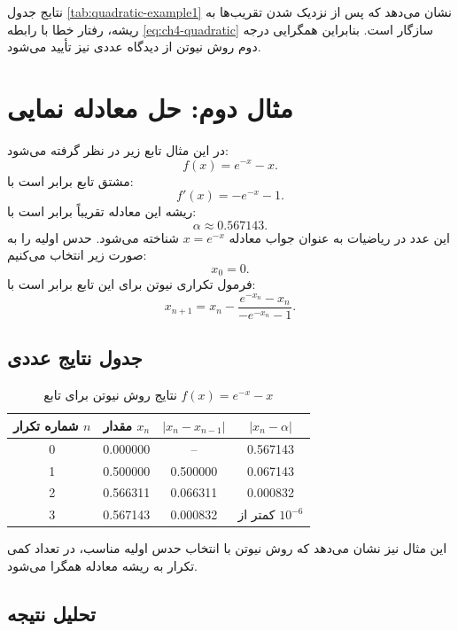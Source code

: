 نتایج جدول \ref{tab:quadratic-example1} نشان می‌دهد که پس از نزدیک شدن تقریب‌ها به ریشه، رفتار خطا با رابطه \eqref{eq:ch4-quadratic} سازگار است. بنابراین همگرایی درجه دوم روش نیوتن از دیدگاه عددی نیز تأیید می‌شود.

\section{مثال دوم: حل معادله نمایی}

در این مثال تابع زیر در نظر گرفته می‌شود:
\begin{equation}
f(x)=e^{-x}-x.
\label{eq:ch4-ex2-func}
\end{equation}
مشتق تابع برابر است با:
\begin{equation}
f'(x)=-e^{-x}-1.
\label{eq:ch4-ex2-deriv}
\end{equation}
ریشه این معادله تقریباً برابر است با:
\[
\alpha \approx 0.567143.
\]
این عدد در ریاضیات به عنوان جواب معادله $x=e^{-x}$ شناخته می‌شود. حدس اولیه را به صورت زیر انتخاب می‌کنیم:
\[
x_0=0.
\]
فرمول تکراری نیوتن برای این تابع برابر است با:
\begin{equation}
x_{n+1}
=
x_n-\frac{e^{-x_n}-x_n}{-e^{-x_n}-1}.
\label{eq:ch4-ex2-newton}
\end{equation}

\subsection{جدول نتایج عددی}

\begin{table}[H]
\centering
\caption{نتایج روش نیوتن برای تابع $f(x)=e^{-x}-x$}
\label{tab:newton-example2}
\renewcommand{\arraystretch}{1.35}
\begin{tabular}{c c c c}
\toprule[1.3pt]
شماره تکرار $n$ & مقدار $x_n$ & $|x_n-x_{n-1}|$ & $|x_n-\alpha|$ \\
\midrule[1pt]
0 & 0.000000 & -- & 0.567143 \\
1 & 0.500000 & 0.500000 & 0.067143 \\
2 & 0.566311 & 0.066311 & 0.000832 \\
3 & 0.567143 & 0.000832 & کمتر از $10^{-6}$ \\
\bottomrule[1.3pt]
\end{tabular}
\end{table}

این مثال نیز نشان می‌دهد که روش نیوتن با انتخاب حدس اولیه مناسب، در تعداد کمی تکرار به ریشه معادله همگرا می‌شود.

\subsection{تحلیل نتیجه}

